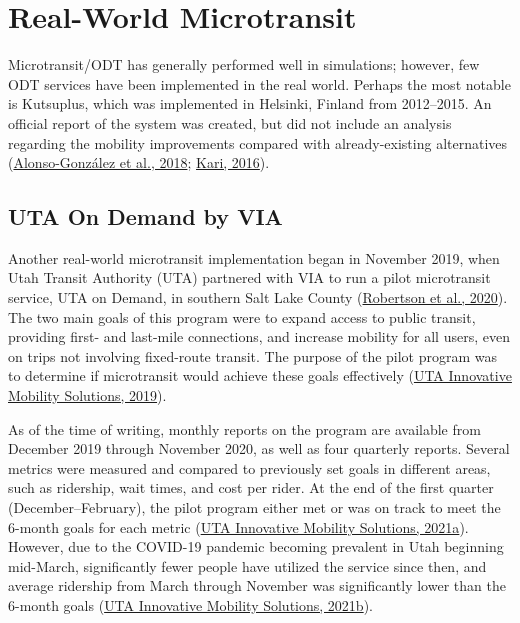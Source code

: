 \documentclass[
]{report}
\begin{document}
\hypertarget{real-world-microtransit}{%
\section{Real-World Microtransit}\label{real-world-microtransit}}

Microtransit/ODT has generally performed well in simulations; however, few ODT services have been implemented in the real world. Perhaps the most notable is Kutsuplus, which was implemented in Helsinki, Finland from 2012--2015. An official report of the system was created, but did not include an analysis regarding the mobility improvements compared with already-existing alternatives (\protect\hyperlink{ref-Alonso-Gonzalez2018}{Alonso-González et al., 2018}; \protect\hyperlink{ref-Kari2016}{Kari, 2016}).

\hypertarget{uta-on-demand-by-via}{%
\subsection{UTA On Demand by VIA}\label{uta-on-demand-by-via}}

Another real-world microtransit implementation began in November 2019, when Utah Transit Authority (UTA) partnered with VIA to run a pilot microtransit service, UTA on Demand, in southern Salt Lake County (\protect\hyperlink{ref-UTAreport}{Robertson et al., 2020}). The two main goals of this program were to expand access to public transit, providing first- and last-mile connections, and increase mobility for all users, even on trips not involving fixed-route transit. The purpose of the pilot program was to determine if microtransit would achieve these goals effectively (\protect\hyperlink{ref-UTAevalDEC}{UTA Innovative Mobility Solutions, 2019}).

As of the time of writing, monthly reports on the program are available from December 2019 through November 2020, as well as four quarterly reports. Several metrics were measured and compared to previously set goals in different areas, such as ridership, wait times, and cost per rider. At the end of the first quarter (December--February), the pilot program either met or was on track to meet the 6-month goals for each metric (\protect\hyperlink{ref-UTAevalQ1}{UTA Innovative Mobility Solutions, 2021a}). However, due to the COVID-19 pandemic becoming prevalent in Utah beginning mid-March, significantly fewer people have utilized the service since then, and average ridership from March through November was significantly lower than the 6-month goals (\protect\hyperlink{ref-UTAevalQ3}{UTA Innovative Mobility Solutions, 2021b}).
\end{document}
